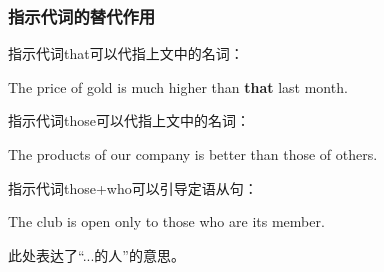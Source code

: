 \documentclass[UTF8]{ctexart}
\newcommand{\littf}[1]{{\hspace{3pt}\ttfamily #1}}
\begin{document}
\subsubsection{指示代词的替代作用}
    指示代词\littf{that\hphantom{x}}可以代指上文中的名词：
    \begin{center}
        \large\ttfamily
        The price of gold is much higher than \textbf{that} last month.\\[4mm]
    \end{center}
    指示代词\littf{those}可以代指上文中的名词：
    \begin{center}
        \large\ttfamily
        The products of our company is better than those of others.\\[4mm]
    \end{center}
    指示代词\littf{those+who}可以引导定语从句：
    \begin{center}
        \large\ttfamily
        The club is open only to those who are its member.\\[4mm]
    \end{center}
    此处表达了“...的人”的意思。

\newpage
\end{document}

